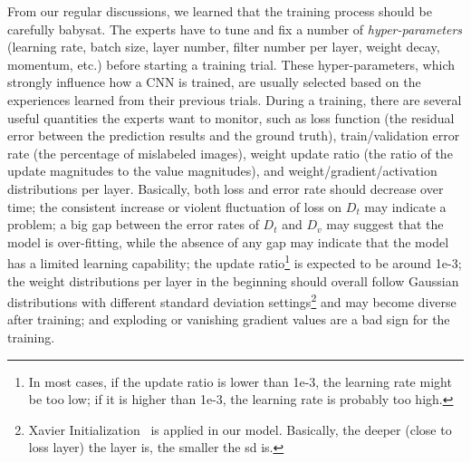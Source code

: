\documentclass[format=acmsmall, review=false, screen=true]{acmart}
\newcommand{\dy}{\textcolor[rgb]{0,0,0}}
\begin{document}
From our regular discussions, we learned that the training process should be carefully babysat. The experts have to tune and fix a number of \textit{hyper-parameters} (learning rate, batch size, layer number, filter number per layer, weight decay, momentum, etc.) before starting a training trial.
These hyper-parameters, which strongly influence how a CNN is trained, are usually selected based on the experiences learned from their previous trials.
During a training, there are several useful quantities the experts want to monitor, such as loss function (the residual error between the prediction results and the ground truth), train/validation error rate (the percentage of mislabeled images), weight update ratio (the ratio of the update magnitudes to the value magnitudes), and weight/gradient/activation distributions per layer. Basically, both loss and error rate should decrease over time; the consistent increase or violent fluctuation of loss on $D_t$ may indicate a problem; a big gap between the error rates of $D_t$ and $D_v$ may suggest that the model is over-fitting, while the absence of any gap may indicate that the model has a limited learning capability; the update ratio\footnote{In most cases, if the update ratio is lower than 1e-3, the learning rate might be too low; if it is higher than 1e-3, the learning rate is probably too high.} is expected to be around 1e-3; the weight distributions per layer in the beginning should overall follow Gaussian distributions with different standard deviation settings\footnote{\label{note7}Xavier Initialization~\cite{glorot2010understanding} is applied in our model. Basically, the deeper (close to loss layer) the layer is, the smaller the sd is.} and may become diverse after training; and exploding or vanishing gradient values are a bad sign for the training.
\end{document}

